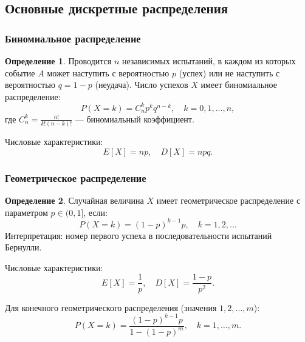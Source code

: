 \documentclass[a4paper]{article}
\theoremstyle{definition}
\newtheorem{definition}{Определение}[subsection]
\begin{document}
\subsection{Основные дискретные распределения}

\subsubsection{Биномиальное распределение}

\begin{definition}
Проводится $n$ независимых испытаний, в каждом из которых событие $A$ может наступить с вероятностью $p$ (успех) или не наступить с вероятностью $q = 1 - p$ (неудача). Число успехов $X$ имеет биномиальное распределение:
\begin{equation}
    P(X = k) = C_n^k p^k q^{n-k}, \quad k = 0, 1, \dots, n, \tag{20}
\end{equation}
где $C_n^k = \frac{n!}{k!(n-k)!}$ — биномиальный коэффициент.
\end{definition}

Числовые характеристики:
\begin{equation}
    E[X] = np, \quad D[X] = npq. \tag{21}
\end{equation}

\subsubsection{Геометрическое распределение}

\begin{definition}
Случайная величина $X$ имеет геометрическое распределение с параметром $p \in (0, 1]$, если:
\begin{equation}
    P(X = k) = (1 - p)^{k-1} p, \quad k = 1, 2, \dots \tag{22}
\end{equation}
Интерпретация: номер первого успеха в последовательности испытаний Бернулли.
\end{definition}

Числовые характеристики:
\begin{equation}
    E[X] = \frac{1}{p}, \quad D[X] = \frac{1 - p}{p^2}. \tag{23}
\end{equation}

Для конечного геометрического распределения (значения $1, 2, \dots, m$):
\begin{equation}
    P(X = k) = \frac{(1 - p)^{k-1} p}{1 - (1 - p)^m}, \quad k = 1, \dots, m. \tag{24}
\end{equation}
\end{document}
